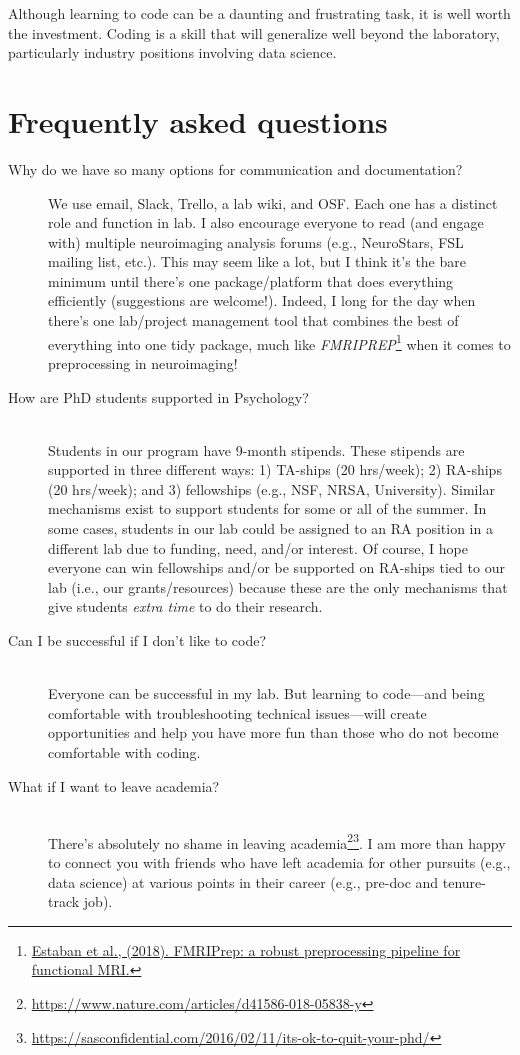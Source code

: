 \documentclass[letterpaper,12pt,oneside]{memoir}
\begin{document}
\begin{shaded}
\noindent Although learning to code can be a daunting and frustrating task, it is well worth the investment. Coding is a skill that will generalize well beyond the laboratory, particularly industry positions involving data science. 
\end{shaded}


\chapter{Frequently asked questions}

\begin{description}
\item[Why do we have so many options for communication and documentation?] \hfill
We use email, Slack, Trello, a lab wiki, and OSF. Each one has a distinct role and function in lab. I also encourage everyone to read (and engage with) multiple neuroimaging analysis forums (e.g., NeuroStars, FSL mailing list, etc.). This may seem like a lot, but I think it's the bare minimum until there's one package/platform that does everything efficiently (suggestions are welcome!). Indeed, I long for the day when there's one lab/project management tool that combines the best of everything into one tidy package, much like \textit{FMRIPREP}\footnote{\href{https://www.biorxiv.org/content/early/2018/07/24/306951}{Estaban et al., (2018). FMRIPrep: a robust preprocessing pipeline for functional MRI.}} when it comes to preprocessing in neuroimaging! 
\item[How are PhD students supported in Psychology?] \hfill \\
Students in our program have 9-month stipends. These stipends are supported in three different ways: 1) TA-ships (20 hrs/week); 2) RA-ships (20 hrs/week); and 3) fellowships (e.g., NSF, NRSA, University). Similar mechanisms exist to support students for some or all of the summer. In some cases, students in our lab could be assigned to an RA position in a different lab due to funding, need, and/or interest. Of course, I hope everyone can win fellowships and/or be supported on RA-ships tied to our lab (i.e., our grants/resources) because these are the only mechanisms that give students \textit{extra time} to do their research. 
\item[Can I be successful if I don't like to code?] \hfill \\
Everyone can be successful in my lab. But learning to code---and being comfortable with troubleshooting technical issues---will create opportunities and help you have more fun than those who do not become comfortable with coding.
\item[What if I want to leave academia?] \hfill \\
There's absolutely no shame in leaving academia\footnote{\url{https://www.nature.com/articles/d41586-018-05838-y}}\footnote{\url{https://sasconfidential.com/2016/02/11/its-ok-to-quit-your-phd/}}. I am more than happy to connect you with friends who have left academia for other pursuits (e.g., data science) at various points in their career (e.g., pre-doc and tenure-track job). 
\end{description}
\end{document}
